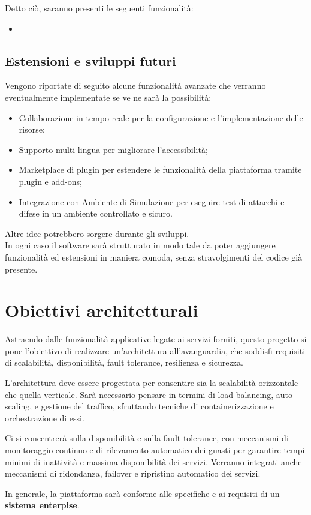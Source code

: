 Detto ciò, saranno presenti le seguenti funzionalità:
\begin{itemize}
    \item 
\end{itemize}


\subsection{Estensioni e sviluppi futuri}
Vengono riportate di seguito alcune funzionalità avanzate che verranno eventualmente implementate se ve ne sarà la possibilità:
\begin{itemize}
    \item Collaborazione in tempo reale per la configurazione e l'implementazione delle risorse;
    \item Supporto multi-lingua per migliorare l'accessibilità;
    \item Marketplace di plugin per estendere le funzionalità della piattaforma tramite plugin e add-ons;
    \item Integrazione con Ambiente di Simulazione per eseguire test di attacchi e difese in un ambiente controllato e sicuro.
\end{itemize}

\noindent Altre idee potrebbero sorgere durante gli sviluppi.\\
In ogni caso il software sarà strutturato in modo tale da poter aggiungere funzionalità ed estensioni in maniera comoda, senza stravolgimenti del codice già presente.

\newpage
\section{Obiettivi architetturali}
Astraendo dalle funzionalità applicative legate ai servizi forniti, questo progetto si pone l'obiettivo di realizzare un'architettura all'avanguardia, che soddisfi requisiti di scalabilità, disponibilità, fault tolerance, resilienza e sicurezza. \newline


L'architettura deve essere progettata per consentire sia la scalabilità orizzontale che quella verticale. Sarà necessario pensare in termini di load balancing, auto-scaling, e gestione del traffico, sfruttando tecniche di containerizzazione e orchestrazione di essi.

Ci si concentrerà sulla disponibilità e sulla fault-tolerance, con meccanismi di monitoraggio continuo e di rilevamento automatico dei guasti per garantire tempi minimi di inattività e massima disponibilità dei servizi. Verranno integrati anche meccanismi di ridondanza, failover e ripristino automatico dei servizi.\newline

\noindent In generale, la piattaforma sarà conforme alle specifiche e ai requisiti di un \textbf{sistema enterpise}.
